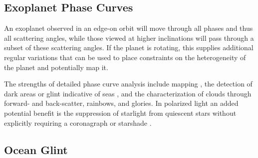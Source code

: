 \documentclass[
    usenatbib,
]{mnras}
\begin{document}


\subsection{Exoplanet Phase Curves}

An exoplanet observed in an edge-on orbit will move through all phases and thus all scattering angles, while those viewed at higher inclinations will pass through a subset of these scattering angles.
%
If the planet is rotating, this supplies additional regular variations that can be used to place constraints on the heterogeneity of the planet and potentially map it.

The strengths of detailed phase curve analysis include mapping \citep{2001Natur.412..885F, berdyugina2019surface}, the detection of dark areas or glint indicative of seas \citep{groot2020, cowan2008inverting, lustig2019}, and the characterization of clouds through forward- and back-scatter, rainbows, and glories.
%
In polarized light an added potential benefit is the suppression of starlight from quiescent stars without explicitly requiring a coronagraph or starshade \citep{kemp1987}.


\subsection{Ocean Glint}
\end{document}
